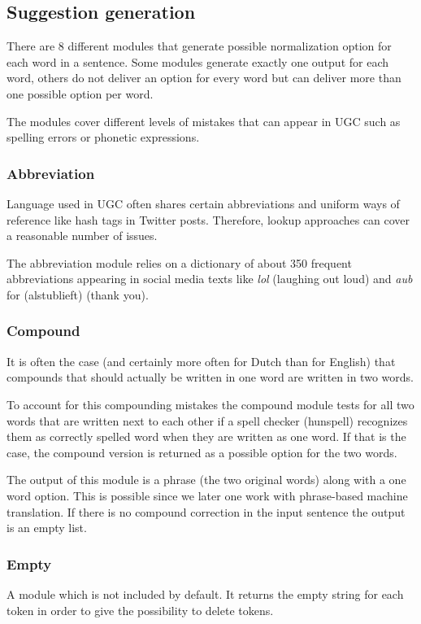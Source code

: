 \documentclass[letterpaper,10pt,english]{sphinxmanual}
\begin{document}
\subsection{Suggestion generation}
\label{README:suggestion-generation}
There are 8 different modules that generate possible normalization option for each word in a sentence. Some modules
generate exactly one output for each word, others do not deliver an option for every word but can deliver more than one
possible option per word.

The modules cover different levels of mistakes that can appear in UGC such as spelling errors or phonetic expressions.


\subsubsection{Abbreviation}
\label{README:abbreviation}
Language used in UGC often shares certain abbreviations and uniform ways of reference like hash tags in Twitter posts. Therefore, lookup approaches can cover a reasonable number of issues.

The abbreviation module relies on a dictionary of about 350 frequent abbreviations appearing in social media texts like \emph{lol} (laughing out loud) and \emph{aub} for (alstublieft) (thank you).


\subsubsection{Compound}
\label{README:compound}
It is often the case (and certainly more often for Dutch than for English) that compounds that should actually be written in one
word are written in two words.

To account for this compounding mistakes the compound module tests for all two words that are written next to each other if a
spell checker (hunspell) recognizes them as correctly spelled word when they are written as one word. If that is the case, the
compound version is returned as a possible option for the two words.

The output of this module is a phrase (the two original words) along with a one word option. This is possible since we later one work
with phrase-based machine translation. If there is no compound correction in the input sentence the output is an empty list.


\subsubsection{Empty}
\label{README:empty}
A module which is not included by default. It returns the empty string for each token in order to give the possibility to delete tokens.
\end{document}
